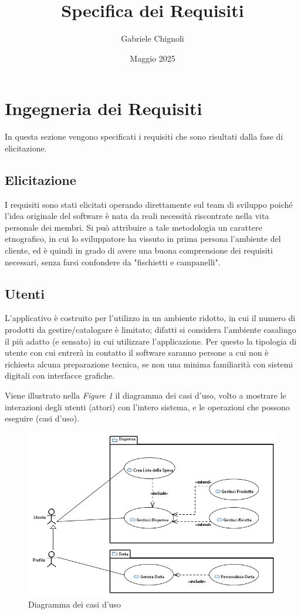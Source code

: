 \documentclass{article}
\title{\huge Specifica dei Requisiti}
\author{Gabriele Chignoli}
\date{Maggio 2025}
\begin{document}
\maketitle
\newpage
\tableofcontents
\newpage

\section{Ingegneria dei Requisiti}
In questa sezione vengono specificati i requisiti che sono risultati dalla fase di elicitazione. 
\subsection{Elicitazione}
I requisiti sono stati elicitati operando direttamente sul team di sviluppo poiché l'idea originale del software è nata da reali necessità riscontrate nella vita personale dei membri. Si può attribuire a tale metodologia un carattere etnografico, in cui lo sviluppatore ha vissuto in prima persona l'ambiente del cliente, ed è quindi in grado di avere una buona comprensione dei requisiti necessari, senza farsi confondere da "fischietti e campanelli".  

\subsection{Utenti}
L'applicativo è costruito per l'utilizzo in un ambiente ridotto, in cui il numero di prodotti da gestire/catalogare è limitato; difatti si considera l'ambiente casalingo il più adatto (e sensato) in cui utilizzare l'applicazione. Per questo la tipologia di utente con cui entrerà in contatto il software saranno persone a cui non è richiesta alcuna preparazione tecnica, se non una minima familiarità con sistemi digitali con interfacce grafiche. \newline 

Viene illustrato nella \textit{Figure 1} il diagramma dei casi d'uso, volto a mostrare le interazioni degli utenti (attori) con l'intero sistema, e le operazioni che possono eseguire (casi d'uso).

\begin{figure}[H]
    \centering
    \includegraphics[width=\textwidth]{imgs/DiagrammaDeiCasiDUso_0.png}
    \caption{Diagramma dei casi d'uso}
    \label{fig:enter-label}
\end{figure}
\end{document}
